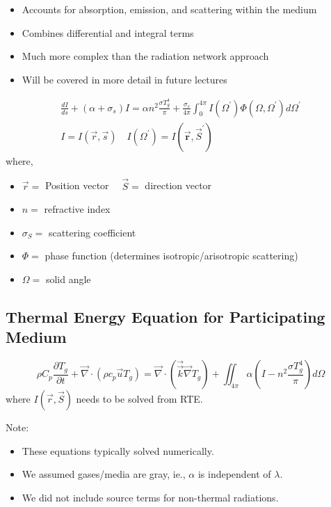 \begin{itemize}
    \item Accounts for absorption, emission, and scattering within the medium
    \item Combines differential and integral terms
    \item Much more complex than the radiation network approach
    \item Will be covered in more detail in future lectures
\end{itemize}
\[
    \begin{gathered}
    \frac{d I}{d s}+\left(\alpha+\sigma_s\right) I=\alpha n^2 \frac{\sigma T_g^4}{\pi}+\frac{\sigma_s}{4 \pi} \int_0^{4 \pi} I\left(\Omega^{\prime}\right) \Phi\left(\Omega, \Omega^{\prime}\right) d \Omega^{\prime} \\
    I=I(\vec{r}, \vec{s}) \quad I\left(\Omega^{\prime}\right)=I\left(\overrightarrow{\mathbf{r}}, \vec{S}^{\prime}\right)
    \end{gathered}
\]
where,
\begin{itemize}
    \item $\vec{r}=$ Position vector $\quad \vec{S}=$ direction vector
    \item $n=$ refractive index
    \item $\sigma_S=$ scattering coefficient
    \item $\Phi=$ phase function (determines isotropic/arisotropic scattering)
    \item $\Omega=$ solid angle
\end{itemize}
%
\subsection*{Thermal Energy Equation for Participating Medium}
\[
\rho C_p \frac{\partial T_g}{\partial t}+\vec{\nabla} \cdot\left(\rho c_p \vec{u} T_g\right)=\vec{\nabla} \cdot\left(\overrightarrow{\vec{k}} \vec{\nabla} T_g\right)+\iint_{4 \pi} \alpha\left(I-n^2 \frac{\sigma T_g^4}{\pi}\right) d \Omega
\]
where $I(\vec{r}, \vec{S})$ needs to be solved from RTE.

\textbf{}

Note: 
\begin{itemize}
    \item These equations typically solved numerically.
    \item We assumed gases/media are gray, ie., $\alpha$ is independent of $\lambda$.
    \item We did not include source terms for non-thermal radiations.
\end{itemize}

